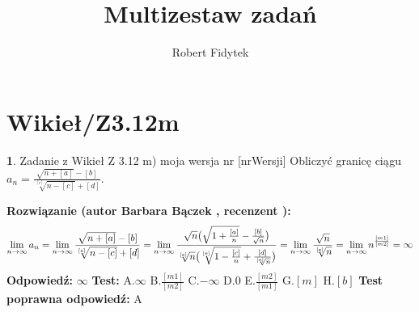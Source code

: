 \documentclass[12pt, a4paper]{article}
\title{Multizestaw zadań}
\author{Robert Fidytek}
\date{}
\theoremstyle{definition} %
\newtheorem{zad}{}
\newcommand{\kategoria}[1]{\section{#1}} %
\newcommand{\zadStart}[1]{\begin{zad}#1\newline} %
\newcommand{\zadStop}{\end{zad}}   %
\newcommand{\rozwStart}[2]{\noindent \textbf{Rozwiązanie (autor #1 , recenzent #2): }\newline} %
\newcommand{\rozwStop}{\newline}                                            %
\newcommand{\odpStart}{\noindent \textbf{Odpowiedź:}\newline}    %
\newcommand{\odpStop}{\newline}                                             %
\newcommand{\testStart}{\noindent \textbf{Test:}\newline} %
\newcommand{\testStop}{\newline} %
\newcommand{\kluczStart}{\noindent \textbf{Test poprawna odpowiedź:}\newline} %
\newcommand{\kluczStop}{\newline} %
\begin{document}
\maketitle


\kategoria{Wikieł/Z3.12m}
\zadStart{Zadanie z Wikieł Z 3.12 m) moja wersja nr [nrWersji]}
Obliczyć granicę ciągu $a_n= \frac{\sqrt{n+[a]}-[b]}{\sqrt[{[e]}]{n-[c]}+[d]}$.
\zadStop
\rozwStart{Barbara Bączek}{}
$$\lim_{n \rightarrow \infty} a_n= \lim_{n \rightarrow \infty} \frac{\sqrt{n+[a]}-[b]}{\sqrt[{[e]}]{n-[c]}+[d]}= \lim_{n \rightarrow \infty} \frac{\sqrt{n}\big{(}\sqrt{1+\frac{[a]}{n}}-\frac{[b]}{\sqrt{n}}\big{)}}{\sqrt[{[e]}]{n}\big{(}\sqrt[{[e]}]{1-\frac{[c]}{n}}+\frac{[d]}{\sqrt[{[e]}]{n}}\big{)}}=  \lim_{n \rightarrow \infty} \frac{\sqrt{n}}{\sqrt[{[e]}]{n}}= \lim_{n \rightarrow \infty} n^{\frac{[m1]}{[m2]}}= \infty $$ 
\rozwStop
\odpStart
$\infty$
\odpStop
\testStart
A.$\infty$
B.$\frac{[m1]}{[m2]}$
C.$-\infty$
D.$0$
E.$\frac{[m2]}{[m1]}$
G.$[m]$
H.$[b]$
\testStop
\kluczStart
A
\kluczStop
\end{document}
